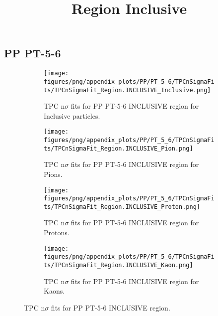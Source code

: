             \subsection{PP PT-5-6}
            \begin{figure}[H]
                \title{Region Inclusive}
                \begin{subfigure}[b]{0.5\textwidth}
                    \centering
                    \texttt{[image: figures/png/appendix\_plots/PP/PT\_5\_6/TPCnSigmaFits/TPCnSigmaFit\_Region.INCLUSIVE\_Inclusive.png]}
                    \caption{TPC n$\sigma$ fits for PP PT-5-6 INCLUSIVE region for Inclusive particles.}
                    \label{fig:appendix_PP_PT-5-6_INCLUSIVE_Inclusive}
                \end{subfigure}
                \begin{subfigure}[b]{0.5\textwidth}
                    \centering
                    \texttt{[image: figures/png/appendix\_plots/PP/PT\_5\_6/TPCnSigmaFits/TPCnSigmaFit\_Region.INCLUSIVE\_Pion.png]}
                    \caption{TPC n$\sigma$ fits for PP PT-5-6 INCLUSIVE region for Pions.}
                    \label{fig:appendix_PP_PT-5-6_INCLUSIVE_Pion}
                \end{subfigure}
                \begin{subfigure}[b]{0.5\textwidth}
                    \centering
                    \texttt{[image: figures/png/appendix\_plots/PP/PT\_5\_6/TPCnSigmaFits/TPCnSigmaFit\_Region.INCLUSIVE\_Proton.png]}
                    \caption{TPC n$\sigma$ fits for PP PT-5-6 INCLUSIVE region for Protons.}
                    \label{fig:appendix_PP_PT-5-6_INCLUSIVE_Proton}
                \end{subfigure}
                \begin{subfigure}[b]{0.5\textwidth}
                    \centering
                    \texttt{[image: figures/png/appendix\_plots/PP/PT\_5\_6/TPCnSigmaFits/TPCnSigmaFit\_Region.INCLUSIVE\_Kaon.png]}
                    \caption{TPC n$\sigma$ fits for PP PT-5-6 INCLUSIVE region for Kaons.}
                    \label{fig:appendix_PP_PT-5-6_INCLUSIVE_Kaon}
                \end{subfigure}
                \caption{TPC n$\sigma$ fits for PP PT-5-6 INCLUSIVE region.}
                \label{fig:appendix_PP_PT-5-6_INCLUSIVE}
            \end{figure}
